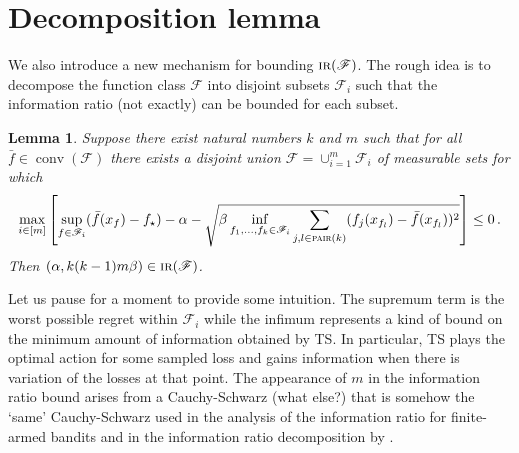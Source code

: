 \documentclass[letter, 12pt]{report}
\newcommand{\pair}{\operatorname{\textsc{pair}}}
\newcommand{\sF}{\mathscr F}
\newcommand{\conv}{\operatorname{conv}}
\newcommand{\1}{\mathbf{1}}
\newcommand{\IR}{\operatorname{\textsc{ir}}}
\newcommand{\ts}{\textsc{TS}\xspace}
\theoremstyle{plain}
\newtheorem{lemma}[theorem]{Lemma}
\theoremstyle{definition}
\theoremstyle{remark}
\begin{document}
\section{Decomposition lemma}
We also introduce a new mechanism for bounding $\IR(\sF)$.
The rough idea is to decompose the function class $\sF$ into disjoint subsets $\sF_i$ such that the information ratio (not exactly) can be bounded for each subset.
\begin{lemma}\label{lem:decomp-big}
    Suppose there exist natural numbers $k$ and $m$ such that for all $\bar f \in \conv(\sF)$ there exists a disjoint union $\sF = \cup_{i=1}^m \sF_i$ of measurable sets
    for which
    \begin{align*}
        \max_{i \in [m]} \left[\sup_{f \in \sF_i} (\bar f(x_f) - f_\star) - \alpha - \sqrt{\beta \inf_{f_1,\ldots,f_k \in \sF_i} \sum_{j,l \in \pair(k)} (f_j(x_{f_l}) - \bar f(x_{f_l}))^2} \right] \leq 0 \,.
    \end{align*}
    Then $(\alpha, k(k-1)m\beta) \in \IR(\sF)$.
\end{lemma}
Let us pause for a moment to provide some intuition.
The supremum term is the worst possible regret within $\sF_i$ while the infimum represents a kind of bound on the minimum amount of information obtained by \ts{}.
In particular, \ts{} plays the optimal action for some sampled loss and gains information when there is variation of the losses at that point.
The appearance of $m$ in the information ratio bound arises from a Cauchy-Schwarz (what else?) that is somehow the `same' Cauchy-Schwarz used in the analysis
of the information ratio for finite-armed bandits \citep{RV14} and in the information ratio decomposition by \cite{Lat20-cvx}.
\end{document}
